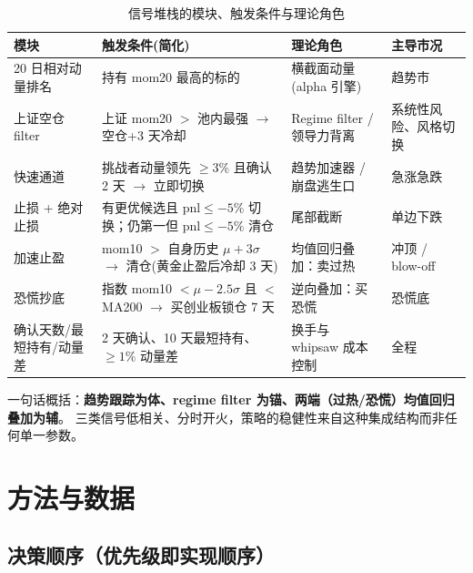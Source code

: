 \documentclass[11pt]{ctexart}
\begin{document}
\begin{table}[htbp]
\centering
\caption{信号堆栈的模块、触发条件与理论角色}
\begin{tabularx}{\textwidth}{p{3.2cm}XXX}
\toprule
模块 & 触发条件(简化) & 理论角色 & 主导市况 \\
\midrule
20 日相对动量排名 & 持有 mom20 最高的标的 & 横截面动量(alpha 引擎) & 趋势市 \\
上证空仓 filter & 上证 mom20 $>$ 池内最强 $\rightarrow$ 空仓+3 天冷却 & Regime filter / 领导力背离 & 系统性风险、风格切换 \\
快速通道 & 挑战者动量领先 $\ge3\%$ 且确认 2 天 $\rightarrow$ 立即切换 & 趋势加速器 / 崩盘逃生口 & 急涨急跌 \\
止损 + 绝对止损 & 有更优候选且 pnl$\le-5\%$ 切换；仍第一但 pnl$\le-5\%$ 清仓 & 尾部截断 & 单边下跌 \\
加速止盈 & mom10 $>$ 自身历史 $\mu+3\sigma$ $\rightarrow$ 清仓(黄金止盈后冷却 3 天) & 均值回归叠加：卖过热 & 冲顶 / blow-off \\
恐慌抄底 & 指数 mom10 $<\mu-2.5\sigma$ 且 $<$ MA200 $\rightarrow$ 买创业板锁仓 7 天 & 逆向叠加：买恐慌 & 恐慌底 \\
确认天数/最短持有/动量差 & 2 天确认、10 天最短持有、$\ge1\%$ 动量差 & 换手与 whipsaw 成本控制 & 全程 \\
\bottomrule
\end{tabularx}
\end{table}

一句话概括：\textbf{趋势跟踪为体、regime filter 为锚、两端（过热/恐慌）均值回归叠加为辅}。
三类信号低相关、分时开火，策略的稳健性来自这种集成结构而非任何单一参数。

\section{方法与数据}

\subsection{决策顺序（优先级即实现顺序）}
\end{document}
